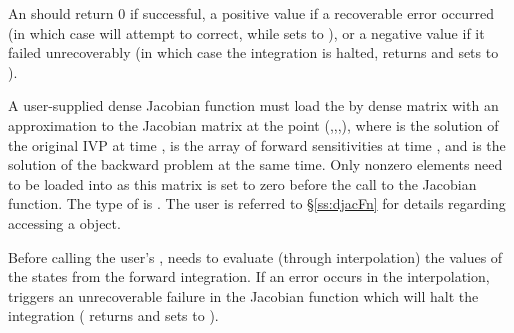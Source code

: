 {
  An  should return 0 if successful, a positive value if a recoverable
  error occurred (in which case {\idas} will attempt to correct, while {\idadense} sets
   to ), or a negative 
  value if it failed unrecoverably (in which case the integration is halted, 
  returns  and {\idadense} sets  to 
  ).
}
{
  A user-supplied dense Jacobian function must load the  by 
  dense matrix  with an approximation to the Jacobian matrix
  at the point (,,,), where  is the solution
  of the original IVP at time ,  is the array of forward sensitivities
  at time , and  is the solution of the backward problem at the same time.
  Only nonzero elements need to be loaded into  as this matrix 
  is set to zero before the call to the Jacobian function. 
  The type of  is . The user is referred to 
  \S\ref{ss:djacFn} for details regarding accessing a  object.

  {\warn}Before calling the user's , {\idas} needs to evaluate
  (through interpolation) the values of the states from the forward integration. 
  If an error occurs in the interpolation, {\idas} triggers an unrecoverable
  failure in the Jacobian function which will halt the integration
  ( returns  and {\idadense} sets  to 
  ).
}


